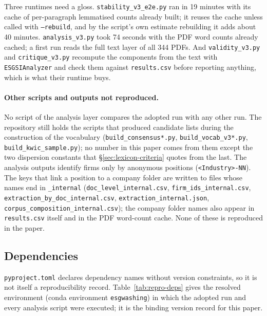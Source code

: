 Three runtimes need a gloss. \nolinkurl{stability_v3_e2e.py} ran in 19
minutes with its cache of per-paragraph lemmatised counts already built; it
reuses the cache unless called with \texttt{--rebuild}, and by the script's own
estimate rebuilding it adds about 40 minutes. \nolinkurl{analysis_v3.py} took 74 seconds with the
PDF word counts already cached; a first run reads the full text layer of all
344 PDFs. And \nolinkurl{validity_v3.py} and \nolinkurl{critique_v3.py}
recompute the components from the text with \texttt{ESGSIAnalyzer} and check
them against \texttt{results.csv} before reporting anything, which is what
their runtime buys.

\paragraph{Other scripts and outputs not reproduced.} No script of the
analysis layer compares the adopted run with any other run. The repository still holds the scripts that produced candidate lists during the
construction of the vocabulary (\nolinkurl{build_consensus*.py},
\nolinkurl{build_vocab_v3*.py}, \nolinkurl{build_kwic_sample.py}); no number in
this paper comes from them except the two dispersion constants that
\S\ref{sec:lexicon-criteria} quotes from the last. The analysis outputs
identify firms only by anonymous positions (\texttt{<Industry>-NN}). The keys
that link a position to a company folder are written to files whose names end
in \texttt{\_internal} (\nolinkurl{doc_level_internal.csv},
\nolinkurl{firm_ids_internal.csv}, \nolinkurl{extraction_by_doc_internal.csv},
\nolinkurl{extraction_internal.json}, \nolinkurl{corpus_composition_internal.csv});
the company folder names also appear in \texttt{results.csv} itself and in the
PDF word-count cache. None of these is reproduced in the paper.

\subsection{Dependencies}

\nolinkurl{pyproject.toml} declares dependency names without version
constraints, so it is not itself a reproducibility record.
Table~\ref{tab:repro-deps} gives the resolved environment (conda environment
\texttt{esgwashing}) in which the adopted run and every analysis script were
executed; it is the binding version record for this paper.

